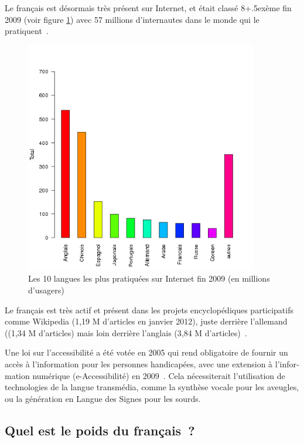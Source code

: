 \begin{french}
\begin{multicols}{2}
Le français est désormais très présent sur Internet, et était classé
8\raise+.5ex\hbox{ème} fin 2009 (voir figure \ref{fig:internettop10})
avec 57 millions d'internautes dans le monde qui le pratiquent~\cite{internettop10}.
%
\begin{figure}[t]
\begin{center}
 \includegraphics[height=4.0in]{_media/french/french_pix2_top_10_Internet_languages_2010.png}
  \caption{Les 10 langues les plus pratiquées sur Internet fin 2009 (en millions d'usagers)~\cite{internettop10}}
  \label{fig:internettop10}
\end{center}
\end{figure}

Le français est très actif et présent dans les projets encyclopédiques participatifs comme Wikipedia (1,19 M d'articles en janvier 2012), juste derrière l'allemand ((1,34 M d'articles) mais loin derrière l'anglais (3,84 M d'articles)~\cite{wikipediastats}.

Une loi sur l'accessibilité a été votée en 2005 qui rend
obligatoire de fournir un accès à l'information pour les
personnes handicapées, avec une extension à l'information
numérique (e-Accessibilité) en 2009~\cite{loi}. Cela nécessiterait
l'utilisation de technologies de la langue transmédia, comme
la synthèse vocale pour les aveugles, ou la génération en Langue des
Signes pour les sourds.

\subsection{Quel est le poids du français~?}


\end{multicols}
\end{french}
